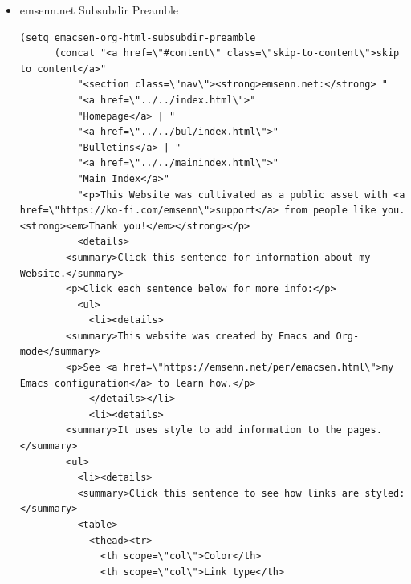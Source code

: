 \documentclass[11pt]{article}
\begin{document}
\begin{itemize}
\begin{itemize}
\begin{itemize}
\begin{itemize}
\begin{verbatim}
	      <details>
		<summary>Click this sentence for information about my Website.</summary>
		<p>Click each sentence below for more info:</p>
		  <ul>
		    <li><details>
		<summary>This website was created by Emacs and Org-mode</summary>
		<p>See <a href=\"https://emsenn.net/per/emacsen.html\">my Emacs configuration</a> to learn how.</p>
		    </details></li>
		    <li><details>
		<summary>It uses style to add information to the pages.</summary>
		<ul>
		  <li><details>
		  <summary>Click this sentence to see how links are styled:</summary>
		  <table>
		    <thead><tr>
		      <th scope=\"col\">Color</th>
		      <th scope=\"col\">Link type</th>
		    </tr></thead>
		    <tbody>
		      <tr><td class=\"link\">Sample</td>
			<td>Unvisited local resource</td></tr>
		      <tr><td class=\"visited-link\">Sample</td>
			<td>Visited local resource</td></tr>
		      <tr><td class=\"external-link\">Sample</td>
			<td>Unvisited external resource</td></tr>
		      <tr><td class=\"visited-external-link\">Sample</td>
			<td>Visited external resource</td></tr>
		    </tbody>
		  </table>
		</details></li>
		    </ul>
		  </details></li>
		</ul>
	      </details>
	      "
	      "</section>"
	      ))
\end{verbatim}
\item emsenn.net Subsubdir Preamble
\label{sec:org4a8aa93}
\begin{verbatim}
(setq emacsen-org-html-subsubdir-preamble
      (concat "<a href=\"#content\" class=\"skip-to-content\">skip to content</a>"
	      "<section class=\"nav\"><strong>emsenn.net:</strong> "
	      "<a href=\"../../index.html\">"
	      "Homepage</a> | "
	      "<a href=\"../../bul/index.html\">"
	      "Bulletins</a> | "
	      "<a href=\"../../mainindex.html\">"
	      "Main Index</a>"
	      "<p>This Website was cultivated as a public asset with <a href=\"https://ko-fi.com/emsenn\">support</a> from people like you. <strong><em>Thank you!</em></strong></p>
	      <details>
		<summary>Click this sentence for information about my Website.</summary>
		<p>Click each sentence below for more info:</p>
		  <ul>
		    <li><details>
		<summary>This website was created by Emacs and Org-mode</summary>
		<p>See <a href=\"https://emsenn.net/per/emacsen.html\">my Emacs configuration</a> to learn how.</p>
		    </details></li>
		    <li><details>
		<summary>It uses style to add information to the pages.</summary>
		<ul>
		  <li><details>
		  <summary>Click this sentence to see how links are styled:</summary>
		  <table>
		    <thead><tr>
		      <th scope=\"col\">Color</th>
		      <th scope=\"col\">Link type</th>

\end{verbatim}
\end{itemize}
\end{itemize}
\end{itemize}
\end{itemize}
\end{document}
